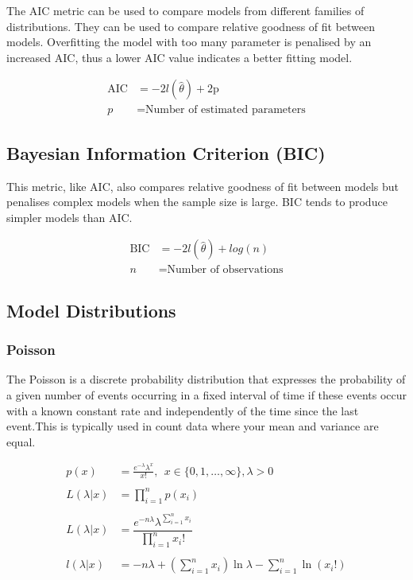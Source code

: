 \documentclass[11pt,preprint, authoryear]{elsarticle}
\numberwithin{equation}{section}
\numberwithin{figure}{section}
\numberwithin{table}{section}
\begin{document}
The AIC metric can be used to compare models from different families of
distributions. They can be used to compare relative goodness of fit
between models. Overfitting the model with too many parameter is
penalised by an increased AIC, thus a lower AIC value indicates a better
fitting model.

\begin{align*}
\text{AIC} &= -2l(\hat{\theta}) + 2\text{p} \\
p &= \text{Number of estimated parameters}
\end{align*}

\subsection{Bayesian Information Criterion
(BIC)}\label{bayesian-information-criterion-bic}

This metric, like AIC, also compares relative goodness of fit between
models but penalises complex models when the sample size is large. BIC
tends to produce simpler models than AIC.

\begin{align*}
\text{BIC} &= -2l(\hat{\theta}) + log(n) \\
n &= \text{Number of observations}
\end{align*}

\subsection{Model Distributions}\label{model-distributions}

\subsubsection{Poisson}\label{poisson}

The Poisson is a discrete probability distribution that expresses the
probability of a given number of events occurring in a fixed interval of
time if these events occur with a known constant rate and independently
of the time since the last event.This is typically used in count data
where your mean and variance are equal.

\begin{align*} 
p(x) & =  \frac{e^{-\lambda} \lambda^x}{x!},\ \ x\in \{0,1,\ldots,\infty\},\lambda>0 \\
\\
L(\lambda|x) & = \prod_{i=1}^n p(x_i) \\
\\
L(\lambda|x) & =\dfrac{e^{-n\lambda}\lambda^{\sum_{i=1}^n x_i}}{\prod_{i=1}^n x_i!}\\
\\
l(\lambda|x) & =-n\lambda +  \left(\sum_{i=1}^n x_i\right)\ln \lambda - \sum_{i=1}^{n}\ln(x_i!)
\end{align*}
\end{document}
